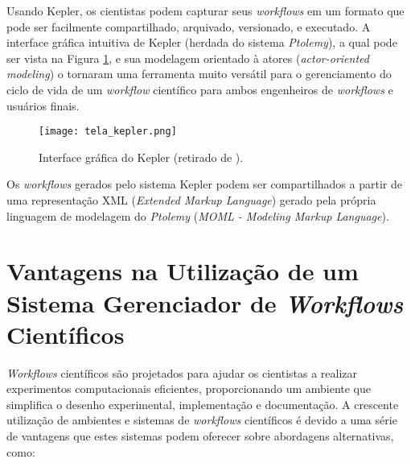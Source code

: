 Usando Kepler, os cientistas podem capturar seus \textit{workflows} em um formato que pode ser facilmente compartilhado, arquivado, versionado, e executado. A interface gráfica intuitiva de Kepler (herdada do sistema \textit{Ptolemy}), a qual pode ser vista na Figura \ref{fig:tela_kepler}, e sua modelagem orientado à atores (\textit{actor-oriented modeling}) o tornaram uma ferramenta muito versátil para o gerenciamento do ciclo de vida de um \textit{workflow} científico para ambos engenheiros de \textit{workflows} e usuários finais.

\begin{figure}[ht]
	\centering
	\texttt{[image: tela\_kepler.png]}
	\caption{Interface gráfica do Kepler (retirado de \cite{kepler_screen}).}
	\label{fig:tela_kepler}
\end{figure}

Os \textit{workflows} gerados pelo sistema Kepler podem ser compartilhados a partir de uma representação XML (\textit{Extended Markup Language}) gerado pela própria linguagem de modelagem do \textit{Ptolemy} (\textit{MOML - Modeling Markup Language}). \\

\section{Vantagens na Utilização de um Sistema Gerenciador de \textit{Workflows} Científicos} \label{cap3sec5}

\textit{Workflows} científicos são projetados para ajudar os cientistas a realizar experimentos computacionais eficientes, proporcionando um ambiente que simplifica o desenho experimental, implementação e documentação. A crescente utilização de ambientes e sistemas de \textit{workflows} científicos é devido a uma série de vantagens que estes sistemas podem oferecer sobre abordagens alternativas, como:

